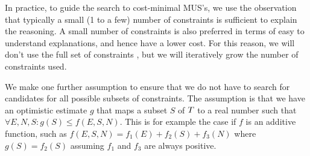 In practice, to guide the search to cost-minimal MUS's, we use the observation that typically a small (1 to a few) number of constraints is sufficient to explain the reasoning. A small number of constraints is also preferred in terms of easy to understand explanations, and hence have a lower cost. For this reason, we will don't use the full set of constraints \allconstraints, but we will iteratively grow the number of constraints used.

We make one further assumption to ensure that we do not have to search for candidates for all possible subsets of constraints. The assumption is that we have an optimistic estimate $g$ that maps a subset $S$ of $T$ to a real number such that  $\forall E, N, S: g(S) \leq f(E, S, N)$. This is for example the case if $f$ is an additive function, such as $f(E, S, N) = f_1(E) + f_2(S) + f_3(N)$ where $g(S) = f_2(S)$ assuming $f_1$ and $f_3$ are always positive.
